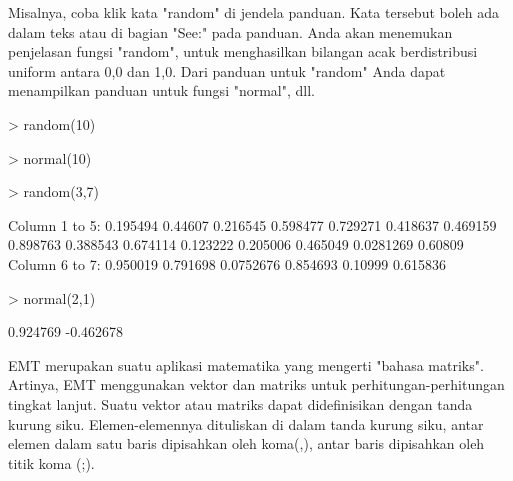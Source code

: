 \documentclass{report}
\begin{document}
\begin{eulernotebook}
\begin{eulercomment}
\begin{eulercomment}
\begin{eulercomment}
Misalnya, coba klik kata "random" di jendela panduan. Kata tersebut
boleh ada dalam teks atau di bagian "See:" pada panduan. Anda akan
menemukan penjelasan fungsi "random", untuk menghasilkan bilangan acak
berdistribusi uniform antara 0,0 dan 1,0. Dari panduan untuk "random"
Anda dapat menampilkan panduan untuk fungsi "normal", dll.
\end{eulercomment}
\begin{eulerprompt}
> random(10)
\end{eulerprompt}
\begin{euleroutput}
  [0.536137,  0.493453,  0.601344,  0.659461,  0.967468,  0.193151,
  0.935921,  0.0728753,  0.988966,  0.0104376]
\end{euleroutput}
\begin{eulerprompt}
> normal(10)
\end{eulerprompt}
\begin{euleroutput}
  [-2.20095,  0.328981,  -0.260813,  -1.21726,  -0.86474,  -0.577711,
  1.64827,  -0.178411,  -1.27766,  -1.16138]
\end{euleroutput}
\begin{eulerprompt}
> random(3,7)
\end{eulerprompt}
\begin{euleroutput}
  Column 1 to 5:
       0.195494       0.44607      0.216545      0.598477      0.729271 
       0.418637      0.469159      0.898763      0.388543      0.674114 
       0.123222      0.205006      0.465049     0.0281269       0.60809 
  Column 6 to 7:
       0.950019      0.791698 
      0.0752676      0.854693 
        0.10999      0.615836 
\end{euleroutput}
\begin{eulerprompt}
> normal(2,1)
\end{eulerprompt}
\begin{euleroutput}
       0.924769 
      -0.462678 
\end{euleroutput}
\begin{eulercomment}
EMT merupakan suatu aplikasi matematika yang mengerti "bahasa
matriks". Artinya, EMT menggunakan vektor dan matriks untuk
perhitungan-perhitungan tingkat lanjut. Suatu vektor atau matriks
dapat didefinisikan dengan tanda kurung siku. Elemen-elemennya
dituliskan di dalam tanda kurung siku, antar elemen dalam satu baris
dipisahkan oleh koma(,), antar baris dipisahkan oleh titik koma (;).


\end{eulercomment}
\end{eulercomment}
\end{eulercomment}
\end{eulernotebook}
\end{document}
